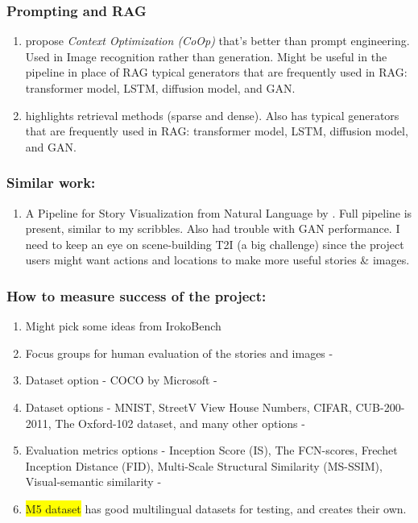 \subsubsection{Prompting and RAG}
\begin{enumerate}
    \item \cite{zhou2022learning}  propose \textit{Context Optimization (CoOp)} that's better than prompt engineering. Used in Image recognition rather than generation. Might be useful in the pipeline in place of RAG typical generators that are frequently used in RAG: transformer model, LSTM, diffusion model, and GAN.
    \item \cite{zhao2024retrieval} highlights retrieval methods (sparse and dense). Also has typical generators that are frequently used in RAG: transformer model, LSTM, diffusion model, and GAN.

\end{enumerate}

\subsubsection{Similar work:}
\begin{enumerate}
    \item A Pipeline for Story Visualization from Natural Language by \cite{storyviz1}. Full pipeline is present, similar to my scribbles. Also had trouble with GAN performance. I need to keep an eye on scene-building T2I (a big challenge) since the project users might want actions and locations to make more useful stories \& images.
\end{enumerate}

\subsubsection{How to measure success of the project:}
\begin{enumerate}
    \item Might pick some ideas from IrokoBench \cite{adelani2024irokobenchnewbenchmarkafrican}
    \item Focus groups for human evaluation of the stories and images - \cite{Qadri}
    \item Dataset option - COCO by Microsoft - \cite{zakraoui2021improving}
    \item Dataset options - MNIST, StreetV View House Numbers, CIFAR, CUB-200-2011, The Oxford-102 dataset, and many other options - \cite{zhou2021survey}
    \item Evaluation metrics options - Inception Score (IS), The FCN-scores, Frechet Inception Distance (FID), Multi-Scale Structural Similarity (MS-SSIM), Visual-semantic similarity - \cite{zhou2021survey}
    \item \colorbox{yellow}{M5 dataset} \cite{schneider2024m} has good multilingual datasets for testing, and creates their own.
\end{enumerate}

